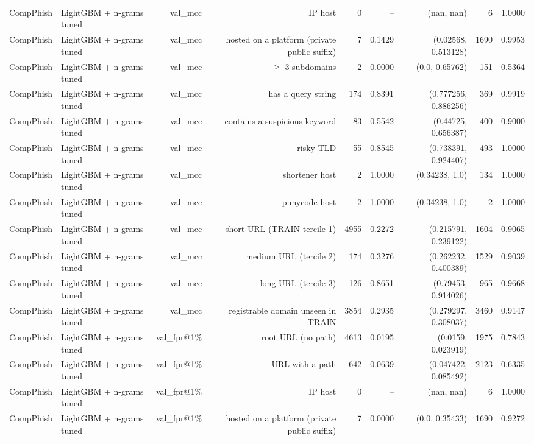 \begin{table}[t]
\begin{tabular}{llrrrrrrr}
CompPhish & LightGBM + n-grams tuned & val\_mcc & IP host & 0 & -- & (nan, nan) & 6 & 1.0000 \\
CompPhish & LightGBM + n-grams tuned & val\_mcc & hosted on a platform (private public suffix) & 7 & 0.1429 & (0.02568, 0.513128) & 1690 & 0.9953 \\
CompPhish & LightGBM + n-grams tuned & val\_mcc & $\geq$ 3 subdomains & 2 & 0.0000 & (0.0, 0.65762) & 151 & 0.5364 \\
CompPhish & LightGBM + n-grams tuned & val\_mcc & has a query string & 174 & 0.8391 & (0.777256, 0.886256) & 369 & 0.9919 \\
CompPhish & LightGBM + n-grams tuned & val\_mcc & contains a suspicious keyword & 83 & 0.5542 & (0.44725, 0.656387) & 400 & 0.9000 \\
CompPhish & LightGBM + n-grams tuned & val\_mcc & risky TLD & 55 & 0.8545 & (0.738391, 0.924407) & 493 & 1.0000 \\
CompPhish & LightGBM + n-grams tuned & val\_mcc & shortener host & 2 & 1.0000 & (0.34238, 1.0) & 134 & 1.0000 \\
CompPhish & LightGBM + n-grams tuned & val\_mcc & punycode host & 2 & 1.0000 & (0.34238, 1.0) & 2 & 1.0000 \\
CompPhish & LightGBM + n-grams tuned & val\_mcc & short URL (TRAIN tercile 1) & 4955 & 0.2272 & (0.215791, 0.239122) & 1604 & 0.9065 \\
CompPhish & LightGBM + n-grams tuned & val\_mcc & medium URL (tercile 2) & 174 & 0.3276 & (0.262232, 0.400389) & 1529 & 0.9039 \\
CompPhish & LightGBM + n-grams tuned & val\_mcc & long URL (tercile 3) & 126 & 0.8651 & (0.79453, 0.914026) & 965 & 0.9668 \\
CompPhish & LightGBM + n-grams tuned & val\_mcc & registrable domain unseen in TRAIN & 3854 & 0.2935 & (0.279297, 0.308037) & 3460 & 0.9147 \\
CompPhish & LightGBM + n-grams tuned & val\_fpr@1\% & root URL (no path) & 4613 & 0.0195 & (0.0159, 0.023919) & 1975 & 0.7843 \\
CompPhish & LightGBM + n-grams tuned & val\_fpr@1\% & URL with a path & 642 & 0.0639 & (0.047422, 0.085492) & 2123 & 0.6335 \\
CompPhish & LightGBM + n-grams tuned & val\_fpr@1\% & IP host & 0 & -- & (nan, nan) & 6 & 1.0000 \\
CompPhish & LightGBM + n-grams tuned & val\_fpr@1\% & hosted on a platform (private public suffix) & 7 & 0.0000 & (0.0, 0.35433) & 1690 & 0.9272 \\

\end{tabular}
\end{table}
